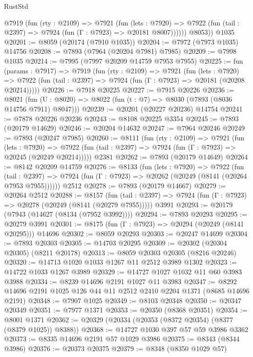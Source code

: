 \begin{lexlean}{RustStd}
\begin{coremodule}
          @7919
            (fun (rty : @2109) =>
            @7921
              (fun (lets : @7920) =>
              @7922 (fun (tail : @2397) => @7924 (fun (Γ : @7923) => @20181 @8007))))))
        @8053))
    @1035
@20201 := @8059 (@20174 (@7910 @1035))
@20204 := @7972 (@7973 @1035) @14756
@20208 := @7893 (@7964 (@20204 @7981) @7985)
@20209 := @7998 @1035
@20214 := @7995 (@7997 @20209 @14759 @7953 @7955)
@20225 := fun (params : @7917) =>
  @7919
    (fun (rty : @2109) =>
    @7921
      (fun (lets : @7920) =>
      @7922 (fun (tail : @2397) => @7924 (fun (Γ : @7923) => @20181 (@20208 @20214)))))
@20226 := @7918 @20225
@20227 := @7915 @20226
@20236 := @8021
    (fun (U : @8020) => @8022 (fun (t : @7) => @8030 (@7893 (@8036 @14756 @7911) @8047)))
@20239 := @20201 (@20227 @20236) @14754
@20241 := @7878 @20226 @20236
@20243 := @8108 @20225 @3354
@20245 := @7893 (@20179 @14629)
@20246 := @20204 @14632
@20247 := @7964 @20246
@20249 := @7893 (@20247 @7985)
@20260 := @8111
    (fun (rty : @2109) =>
    @7921
      (fun (lets : @7920) =>
      @7922 (fun (tail : @2397) => @7924 (fun (Γ : @7923) => @20245 (@20249 @20214)))))
    @2381
@20262 := @7893 (@20179 @14649)
@20264 := @8142 @20209 @14759
@20276 := @8133
    (fun (lets : @7920) =>
    @7922
      (fun (tail : @2397) =>
      @7924 (fun (Γ : @7923) => @20262 (@20249 (@8141 (@20264 @7953 @7955))))))
    @2512
@20278 := @7893 (@20179 @14667)
@20279 := @20264 @2512
@20288 := @8157
    (fun (tail : @2397) => @7924 (fun (Γ : @7923) => @20278 (@20249 (@8141 (@20279 @7955)))))
    @3991
@20293 := @20179 (@7943 (@14627 (@8134 (@7952 @3992))))
@20294 := @7893 @20293
@20295 := @20279 @3991
@20301 := @8175 (fun (Γ : @7923) => @20294 (@20249 (@8141 @20295))) @14696
@20302 := @8059 @20293
@20303 := @20247 @14699
@20304 := @7893 @20303
@20305 := @14703 @20295
@20309 := @20302 (@20304 @20305) (@8211 @20178)
@20313 := @8059 @20303 @20305 (@8216 @20246)
@20320 := @14713 @1020 @1033 @1267 @11 @2512 @3989 @1302
@20323 := @14722 @1033 @1267 @3989
@20329 := @14727 @1027 @1032 @11 @60 @3983 @3988
@20334 := @8239 @14696 @2191 @1027 @11 @3983
@20347 := @8292 @14696 @2191 @1025 @126 @44 @11 @2512 @2410 @2204 @1371 (@8685 @14696 @2191)
@20348 := @7907 @1025
@20349 := @8103 @20348
@20350 := @20347 @20349
@20351 := @7977 @1371
@20353 := @20350 (@8368 @20351)
@20354 := @8001 @1371
@20362 := @20329 (@20334 (@20353 (@8372 @20354) (@8377 (@8379 @1025)) @8388))
@20368 := @14727 @1030 @397 @57 @59 @3986 @3362
@20373 := @8335 @14696 @2191 @57 @1029 @3986
@20375 := @8343 (@8344 @3986)
@20376 := @20373 @20375
@20379 := @8348 (@8350 @1029 @57)

\end{coremodule}
\end{lexlean}
